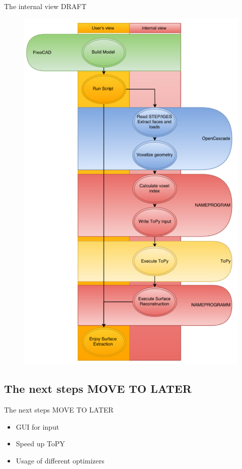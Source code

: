 \begin{frame}{The internal view DRAFT}
\begin{minipage}{0.3\textwidth}
\begin{overlayarea}{\textwidth}{.9\textheight}
\begin{figure}[htp]
	\includegraphics[scale=.25]{Pictures/TopOp/FlowDiagram2.pdf}
\end{figure}
\end{overlayarea}
\end{minipage}
\end{frame}

\subsection{The next steps MOVE TO LATER}
\begin{frame}{The next steps MOVE TO LATER}
\begin{itemize}
\item GUI for input
\item Speed up ToPY
\item Usage of different optimizers
\end{itemize}
\end{frame}